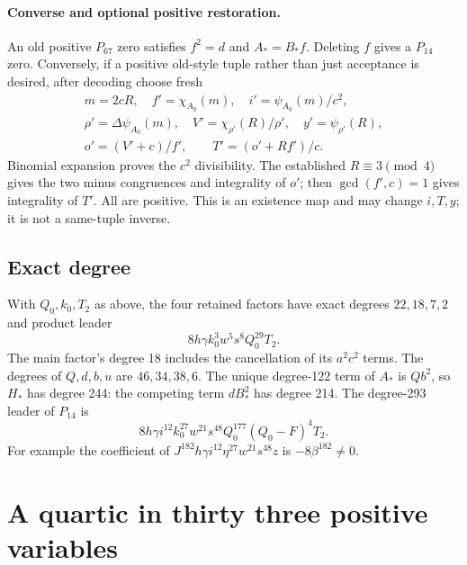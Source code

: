 \documentclass[11pt]{article}
\begin{document}
\paragraph{Converse and optional positive restoration.}
An old positive $P_{67}$ zero satisfies $f^2=d$ and $A_*=B_*f$. Deleting $f$ gives a $P_{14}$ zero. Conversely, if a positive old-style tuple rather than just acceptance is desired, after decoding choose fresh
\begin{gather*}
m=2cR,\quad f'=\chi_{A_0}(m),\quad i'=\psi_{A_0}(m)/c^2,\\
\rho'=\Delta\psi_{A_0}(m),\quad
V'=\chi_{\rho'}(R)/\rho',\quad y'=\psi_{\rho'}(R),\\
o'=(V'+c)/f',\qquad T'=(o'+Rf')/c.
\end{gather*}
Binomial expansion proves the $c^2$ divisibility. The established $R\equiv3\pmod4$ gives the two minus congruences and integrality of $o'$; then $\gcd(f',c)=1$ gives integrality of $T'$. All are positive. This is an existence map and may change $i,T,y$; it is not a same-tuple inverse.

\subsection{Exact degree}

With $Q_0,k_0,T_2$ as above, the four retained factors have exact degrees
$22,18,7,2$ and product leader
\[
8h\gamma k_0^3w^5s^8Q_0^{29}T_2.
\]
The main factor's degree 18 includes the cancellation of its $a^2c^2$ terms. The degrees of $Q,d,b,u$ are $46,34,38,6$. The unique degree-122 term of $A_*$ is $Qb^2$, so $H_*$ has degree 244: the competing term $dB_*^2$ has degree 214. The degree-293 leader of $P_{14}$ is
\[
8h\gamma i^{12}k_0^{27}w^{21}s^{48}Q_0^{177}(Q_0-F)^4T_2.
\]
For example the coefficient of
$J^{182}h\gamma i^{12}\eta^{27}w^{21}s^{48}z$ is $-8\beta^{182}\neq0$.

\section{A quartic in thirty three positive variables}\label{sec:quartic}
\end{document}

